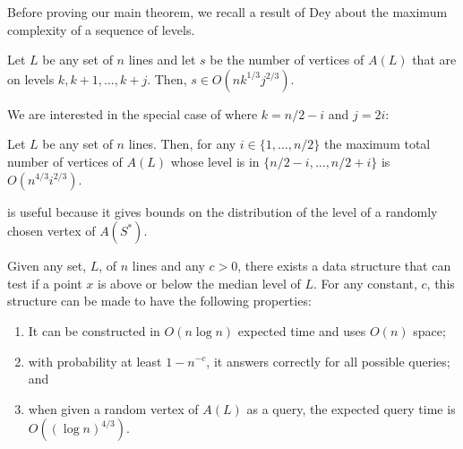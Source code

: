 \documentclass{patmorin}
\begin{document}
Before proving our main theorem, we recall a result of Dey
\cite[Theorem~4.2]{d98} about the maximum complexity of a sequence
of levels.

\begin{lem}
 Let $L$ be any set of $n$ lines and let $s$ be the number of vertices
 of $A(L)$ that are on levels $k,k+1,\ldots,k+j$.  Then, $s \in
 O(nk^{1/3}j^{2/3})$.
\end{lem}

We are interested in the special case of  where $k=n/2-i$
and $j=2i$:

\begin{cor}
  Let $L$ be any set of $n$ lines.  Then, for any $i\in\{1,\ldots,n/2\}$
  the maximum total number of vertices of $A(L)$ whose level is in
  $\{n/2-i,\ldots,n/2+i\}$ is $O(n^{4/3}i^{2/3})$.
\end{cor}

 is useful because it gives bounds on the distribution of
the level of a randomly chosen vertex of $A(S^*)$.

\begin{thm}
  Given any set, $L$, of $n$ lines and any $c>0$, there exists a data
  structure that can test if a point $x$ is above or below the median
  level of $L$.  For any constant, $c$, this structure can be made to
  have the following properties:
  \begin{enumerate}\setlength{\itemsep}{0mm}
    \item It can be constructed in
       $O(n\log n)$ expected time and uses $O(n)$ space;
    \item with probability
       at least $1-n^{-c}$, it answers correctly for all
       possible queries; and
    \item when given a random vertex of $A(L)$
       as a query, the expected query time is $O((\log n)^{4/3})$.
  \end{enumerate}
\end{thm}
\end{document}

